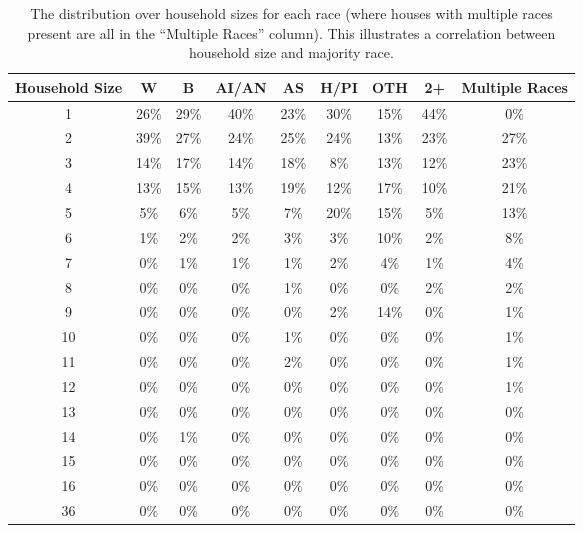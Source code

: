 \begin{table}
\centering
\begin{tabular}{|c|c|c|c|c|c|c|c|c|}
\hline
Household Size & W    & B    & AI/AN & AS   & H/PI & OTH  & 2+   & Multiple Races \\ \hline
1              & 26\% & 29\% & 40\%  & 23\% & 30\% & 15\% & 44\% & 0\%            \\ \hline
2              & 39\% & 27\% & 24\%  & 25\% & 24\% & 13\% & 23\% & 27\%           \\ \hline
3              & 14\% & 17\% & 14\%  & 18\% & 8\%  & 13\% & 12\% & 23\%           \\ \hline
4              & 13\% & 15\% & 13\%  & 19\% & 12\% & 17\% & 10\% & 21\%           \\ \hline
5              & 5\%  & 6\%  & 5\%   & 7\%  & 20\% & 15\% & 5\%  & 13\%           \\ \hline
6              & 1\%  & 2\%  & 2\%   & 3\%  & 3\%  & 10\% & 2\%  & 8\%            \\ \hline
7              & 0\%  & 1\%  & 1\%   & 1\%  & 2\%  & 4\%  & 1\%  & 4\%            \\ \hline
8              & 0\%  & 0\%  & 0\%   & 1\%  & 0\%  & 0\%  & 2\%  & 2\%            \\ \hline
9              & 0\%  & 0\%  & 0\%   & 0\%  & 2\%  & 14\% & 0\%  & 1\%            \\ \hline
10             & 0\%  & 0\%  & 0\%   & 1\%  & 0\%  & 0\%  & 0\%  & 1\%            \\ \hline
11             & 0\%  & 0\%  & 0\%   & 2\%  & 0\%  & 0\%  & 0\%  & 1\%            \\ \hline
12             & 0\%  & 0\%  & 0\%   & 0\%  & 0\%  & 0\%  & 0\%  & 1\%            \\ \hline
13             & 0\%  & 0\%  & 0\%   & 0\%  & 0\%  & 0\%  & 0\%  & 0\%            \\ \hline
14             & 0\%  & 1\%  & 0\%   & 0\%  & 0\%  & 0\%  & 0\%  & 0\%            \\ \hline
15             & 0\%  & 0\%  & 0\%   & 0\%  & 0\%  & 0\%  & 0\%  & 0\%            \\ \hline
16             & 0\%  & 0\%  & 0\%   & 0\%  & 0\%  & 0\%  & 0\%  & 0\%            \\ \hline
36             & 0\%  & 0\%  & 0\%   & 0\%  & 0\%  & 0\%  & 0\%  & 0\%            \\ \hline
\end{tabular}
\caption{The distribution over household sizes for each race (where houses with multiple races present are all in the ``Multiple Races'' column). This illustrates a correlation between household size and majority race.}
\label{tab:household_size_race_corr}
\end{table}

